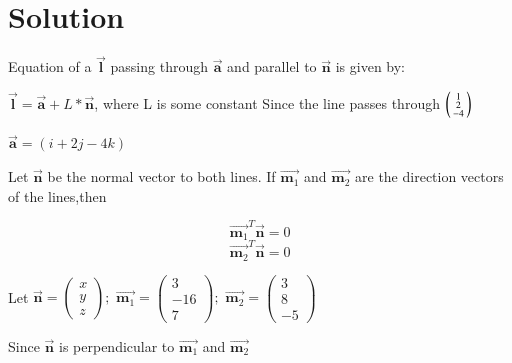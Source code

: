 \documentclass[journal,12pt,twocolumn]{IEEEtran}
\begin{document}
\section{Solution}
\begin{flushleft}
	Equation of a $\overrightarrow{\textbf{l}}$ passing through $\overrightarrow{\textbf{a}}$ and parallel to  $\overrightarrow{\textbf{n}}$ is given by:
\end{flushleft}
\begin{flushleft}
	$\overrightarrow{\textbf{l}} =\overrightarrow{\textbf{a}} + L*\overrightarrow{\textbf{n}} $, where L is some constant
	Since the line passes through 
	$\begin{psmallmatrix}1 \\2\\-4\end{psmallmatrix} $
\end{flushleft}
$\overrightarrow{\textbf{a}} = (i + 2j - 4k)$
\begin{flushleft}
	Let $\overrightarrow{\textbf{n}}$ be the normal vector to both lines. If $\overrightarrow{\textbf{m}_1}$ and $\overrightarrow{\textbf{m}_2}$ are the direction vectors of the lines,then
\end{flushleft}
\begin{equation}
\overrightarrow{\textbf{m}_1}^T  \overrightarrow{\textbf{n}} = 0
\end{equation}
\begin{equation}
\overrightarrow{\textbf{m}_2}^T\overrightarrow{\textbf{n}} = 0
\end{equation}
\begin{flushleft}
	Let 
	$\overrightarrow{\textbf{n}} =\begin{pmatrix} x\\ y\\ z\end{pmatrix} ;$
	$\overrightarrow{\textbf{m}_1} =\begin{pmatrix} 3 \\-16\\ 7\end{pmatrix}; $
	$\overrightarrow{\textbf{m}_2} =\begin{pmatrix} 3 \\ 8\\ -5\end{pmatrix} $
\end{flushleft}
\begin{flushleft}
	Since  $\overrightarrow{\textbf{n}}$ is perpendicular to $\overrightarrow{\textbf{m}_1}$ and $\overrightarrow{\textbf{m}_2}$
\end{flushleft}
\end{document}
